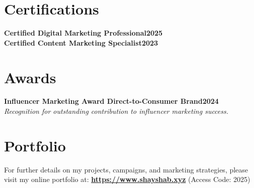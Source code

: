 \documentclass[letterpaper,10pt]{article}
\newcommand{\heading}[2]{
  \hspace{10pt}#1\hfill#2\\
}
\newcommand{\headingBf}[2]{
  \heading{\textbf{#1}}{\textbf{#2}}
}
\newcommand{\headingIt}[2]{
  \heading{\textit{#1}}{\textit{#2}}
}
\begin{document}
\section{Certifications}
\headingBf{Certified Digital Marketing Professional}{2025}
\headingBf{Certified Content Marketing Specialist}{2023}

\vspace{-0.5em}

\section{Awards}
\headingBf{Influencer Marketing Award \textnormal{Direct-to-Consumer Brand}}{2024}
\headingIt{Recognition for outstanding contribution to influencer marketing success.}{}

\section*{Portfolio}
For further details on my projects, campaigns, and marketing strategies, please visit my online portfolio at: \textbf{\href{https://www.shayshab.xyz/}{https://www.shayshab.xyz}} (Access Code: 2025)
\end{document}
